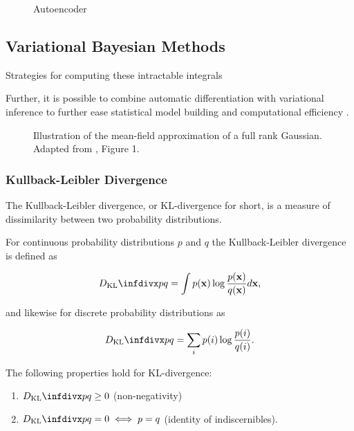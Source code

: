 \cite{hinton_autoencoder}

\begin{figure}[!htb]
  \centering
  \resizebox{\textwidth}{!}{\unskip}
  \caption{Autoencoder}
  \label{fig:ae}
\end{figure}

\newpage \phantom{x}
\newpage

\subsection{Variational Bayesian Methods}
\label{subsection:variational_inference}

Strategies for computing these intractable integrals 

Further, it is possible to combine automatic differentiation with variational inference to further ease statistical model building and computational efficiency \cite{advi}.

\begin{figure}[!htb]
  \centering
  \resizebox{0.5\textwidth}{!}{\unskip}
  \caption{Illustration of the mean-field approximation of a full rank Gaussian. Adapted from \cite{variational_inference_review}, Figure 1.}
  \label{fig:mean_field_approximation}
\end{figure}

\subsubsection{Kullback-Leibler Divergence}

The Kullback-Leibler divergence, or KL-divergence for short, is a measure of dissimilarity between two probability distributions.

For continuous probability distributions $p$ and $q$ the Kullback-Leibler divergence is defined as

$$\dkl{p}{q} = \int p(\mathbf{x}) \log \frac{p(\mathbf{x})}{q(\mathbf{x})} d\mathbf{x},$$

and likewise for discrete probability distributions as

$$\dkl{p}{q} = \sum_{i} p(i) \log \frac{p(i)}{q(i)}.$$

The following properties hold for KL-divergence:

\begin{enumerate}
\item $\dkl{p}{q} \geq 0$ (non-negativity)
\item $\dkl{p}{q} = 0 \iff p = q$ (identity of indiscernibles).
\end{enumerate}

